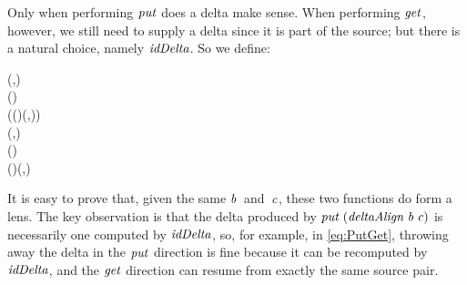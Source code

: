Only when performing \ensuremath{\Varid{put}} does a delta make sense.
When performing \ensuremath{\Varid{get}}, however, we still need to supply a delta since it is part of the source; but there is a natural choice, namely \ensuremath{\Varid{idDelta}}.
So we define:
\begin{hscode}\SaveRestoreHook
{}%
%
%
%
%
\>[B]{}\<[16]%
\>[16]{}\mathbin{::}{}\<[16E]%
\>[20]{}(\;,\;){}\<[E]%
\\
\>[16]{}\Rightarrow {}\<[16E]%
\>[20]{}\;\;\to (\to {})\to {}\to {}\<[E]%
\\
\>[B]{}\;\;\;\;\;\mathrel{=}\;\;(\;(\;\;)\;(,)\;){}\<[E]%
\\[\blanklineskip]%
\>[B]{}\<[16]%
\>[16]{}\mathbin{::}{}\<[16E]%
\>[20]{}(\;,\;){}\<[E]%
\\
\>[16]{}\Rightarrow {}\<[16E]%
\>[20]{}\;\;\to (\to {})\to {}\<[E]%
\\
\>[B]{}\;\;\;\mathrel{=}\;(\;\;)\;(,\;){}\<[E]%
\ColumnHook
\end{hscode}\resethooks
It is easy to prove that, given the same \ensuremath{\Varid{b}}~and~\ensuremath{\Varid{c}}, these two functions do form a lens.
The key observation is that the delta produced by \ensuremath{\Varid{put}\;(\Varid{deltaAlign}\;\Varid{b}\;\Varid{c})} is necessarily one computed by \ensuremath{\Varid{idDelta}}, so, for example, in \ref{eq:PutGet}, throwing away the delta in the \ensuremath{\Varid{put}} direction is fine because it can be recomputed by \ensuremath{\Varid{idDelta}}, and the \ensuremath{\Varid{get}} direction can resume from exactly the same source pair.

